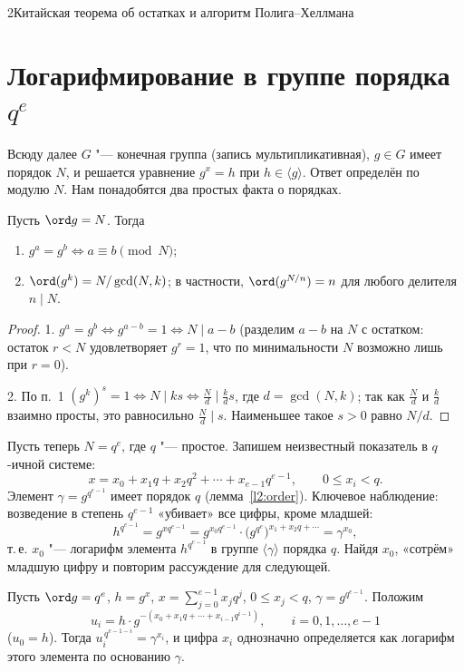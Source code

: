 \begin{lecture}{2}{Китайская теорема об остатках и алгоритм Полига–Хеллмана}


\section{Логарифмирование в группе порядка $q^e$}

Всюду далее $G$ "--- конечная группа (запись мультипликативная), $g \in G$ имеет порядок $N$,
и решается уравнение $g^x = h$ при $h \in \langle g \rangle$. Ответ определён по модулю $N$.
Нам понадобятся два простых факта о порядках.

\begin{lemma}\label{l2:order}
Пусть $\ord g = N$. Тогда
\begin{enumerate}
  \item $g^a = g^b \iff a \equiv b \pmod N$;
  \item $\ord(g^k) = N / \gcd(N, k)$; в частности, $\ord(g^{N/n}) = n$ для любого делителя $n \mid N$.
\end{enumerate}
\end{lemma}

\begin{proof}
1. $g^a = g^b \iff g^{a-b} = 1 \iff N \mid a - b$ (разделим $a - b$ на $N$ с остатком: остаток
$r < N$ удовлетворяет $g^r = 1$, что по минимальности $N$ возможно лишь при $r = 0$).

2. По п.~1 $(g^k)^s = 1 \iff N \mid ks \iff \frac{N}{d} \mid \frac kd s$, где $d = \gcd(N, k)$;
так как $\frac Nd$ и $\frac kd$ взаимно просты, это равносильно $\frac Nd \mid s$. Наименьшее
такое $s > 0$ равно $N/d$.
\end{proof}

Пусть теперь $N = q^e$, где $q$ "--- простое. Запишем неизвестный показатель в $q$-ичной системе:
\[
  x = x_0 + x_1 q + x_2 q^2 + \cdots + x_{e-1} q^{e-1}, \qquad 0 \le x_i < q .
\]
Элемент $\gamma = g^{q^{e-1}}$ имеет порядок $q$ (лемма~\ref{l2:order}). Ключевое наблюдение:
возведение в степень $q^{e-1}$ «убивает» все цифры, кроме младшей:
\[
  h^{q^{e-1}} = g^{x q^{e-1}} = g^{x_0 q^{e-1}} \cdot \bigl(g^{q^e}\bigr)^{x_1 + x_2 q + \cdots}
  = \gamma^{x_0},
\]
т.\,е. $x_0$ "--- логарифм элемента $h^{q^{e-1}}$ в группе $\langle \gamma \rangle$ порядка $q$.
Найдя $x_0$, «сотрём» младшую цифру и повторим рассуждение для следующей.

\begin{theorem}\label{l2:digits}
Пусть $\ord g = q^e$, $h = g^x$, $x = \sum_{j=0}^{e-1} x_j q^j$, $0 \le x_j < q$,
$\gamma = g^{q^{e-1}}$. Положим
\[
  u_i = h \cdot g^{-(x_0 + x_1 q + \cdots + x_{i-1} q^{i-1})}, \qquad i = 0, 1, \dots, e - 1
\]
($u_0 = h$). Тогда $u_i^{\,q^{e-1-i}} = \gamma^{x_i}$, и цифра $x_i$ однозначно определяется как
логарифм этого элемента по основанию $\gamma$.
\end{theorem}


\end{lecture}
